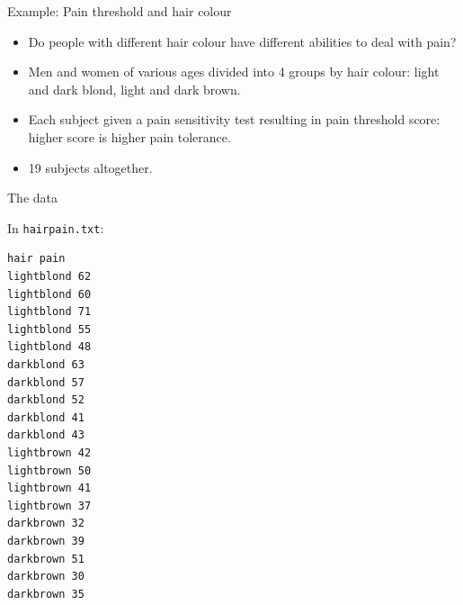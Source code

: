 \documentclass[ignorenonframetext,]{beamer}
\begin{document}
\begin{frame}{Example: Pain threshold and hair colour}
\protect\hypertarget{example-pain-threshold-and-hair-colour}{}

\begin{itemize}
\item
  Do people with different hair colour have different abilities to deal
  with pain?
\item
  Men and women of various ages divided into 4 groups by hair colour:
  light and dark blond, light and dark brown.
\item
  Each subject given a pain sensitivity test resulting in pain threshold
  score: higher score is higher pain tolerance.
\item
  19 subjects altogether.
\end{itemize}

\end{frame}

\begin{frame}[fragile]{The data}
\protect\hypertarget{the-data-6}{}

In \texttt{hairpain.txt}:

\begin{multicols}{2}

\begin{verbatim}
hair pain
lightblond 62
lightblond 60
lightblond 71
lightblond 55
lightblond 48
darkblond 63
darkblond 57
darkblond 52
darkblond 41
darkblond 43
lightbrown 42
lightbrown 50
lightbrown 41
lightbrown 37
darkbrown 32
darkbrown 39
darkbrown 51
darkbrown 30
darkbrown 35
\end{verbatim}

\end{multicols}

\end{frame}
\end{document}
